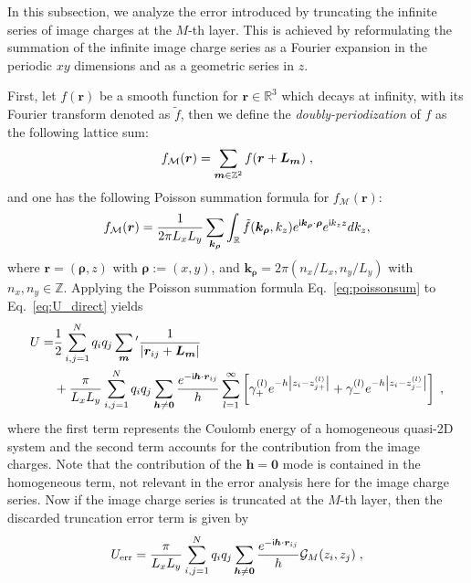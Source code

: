 In this subsection, we analyze the error introduced by truncating the infinite series of image charges at the $M$-th layer. 
This is achieved by reformulating the summation of the infinite image charge series as a Fourier expansion in the periodic $xy$ dimensions and as a geometric series in $z$. 

First, 
let $f(\bm r)$ be a smooth function for $\bm r\in\mathbb R^3$ which decays at infinity, with its Fourier transform denoted as $\widetilde{f}$, then we define the \emph{doubly-periodization} of $f$ as the following lattice sum:
\begin{equation}
f_{\mathcal M} (\bm r)=\sum_{\boldsymbol{m}\in\mathbb{Z}^2} f(\boldsymbol{r}+\boldsymbol{L}_{\bm{m}})\;,
\end{equation}
and one has the following Poisson summation formula for $f_{\mathcal M} (\bm r)$:
\begin{equation}\label{eq:poissonsum}
f_{\mathcal M} (\bm r)=\frac{1}{2 \pi L_x L_y} \sum_{\bm{k}_{\bm{\rho}}} \int_{\mathbb{R}} \tilde{f}(\bm{k}_{\bm{\rho}}, k_z) e^{\mathsf i \bm{k}_{\bm{\rho}} \cdot \boldsymbol{\rho}} e^{\mathsf i k_z z} d k_z,
\end{equation}
where $\bm{r}=(\bm{\rho},z)$ with $\bm{\rho}:=(x,y)$, and $\bm{k}_{\bm{\rho}}=2\pi(n_x/L_x,n_y/L_y)$ with $n_x,n_y\in\mathbb{Z}$. 
Applying the Poisson summation formula Eq.~\eqref{eq:poissonsum} to Eq.~\eqref{eq:U_direct} yields 
\begin{equation}\label{eq::33}
    \begin{split}
        U = & \frac{1}{2}\sum_{i,j=1}^{N}q_iq_j\sum_{\bm{m}}{}^\prime\frac{1}{\left|\bm{r}_{ij}+\boldsymbol{L}_{\bm{m}}\right|} \\
        & + \frac{\pi}{L_xL_y}\sum_{i,j=1}^{N}q_iq_j\sum_{\bm{h}\neq \bm{0}}\frac{e^{-\mathsf i \bm{h}\cdot\bm{r}_{ij}}}{h}  \sum\limits_{l=1}^{\infty}\left[\gamma_+^{(l)}e^{-h\left|z_i-z_{j+}^{(l)}\right|}+\gamma_-^{(l)}e^{-h\left|z_i-z_{j-}^{(l)}\right|}\right] \;,
    \end{split}
\end{equation}
where the first term represents the Coulomb energy of a homogeneous quasi-2D system and the second term accounts for the contribution from the image charges. Note that the contribution of the $\bm{h}=\bm{0}$ mode is contained in the homogeneous term, not relevant in the error analysis here for the image charge series.
Now if the image charge series is truncated at the $M$-th layer, then the discarded truncation error term is given by
\begin{equation}\label{eq:trucation_error}
U_{\text{err}}=\frac{\pi}{L_xL_y}\sum_{i,j=1}^{N}q_iq_j\sum_{\bm{h}\neq \bm{0}}\frac{e^{-\i \bm{h}\cdot\bm{r}_{ij}}}{h}\mathcal{G}_{M}(z_i,z_j)\;,  %
\end{equation}
